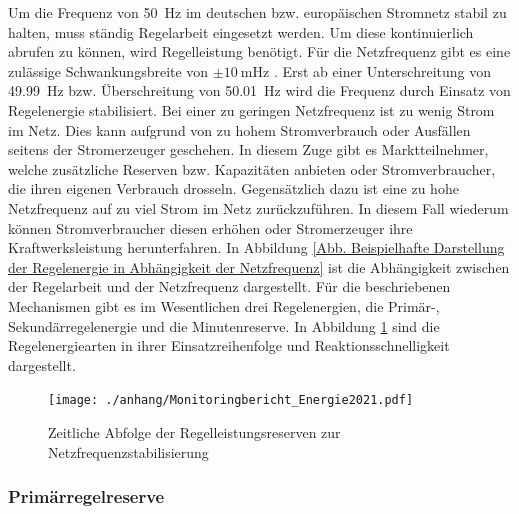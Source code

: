 		Um die Frequenz von \SI{50}{\hertz} im deutschen bzw. europäischen Stromnetz stabil zu halten, muss ständig Regelarbeit eingesetzt werden.
		Um diese kontinuierlich abrufen zu können, wird Regelleistung benötigt.
		Für die Netzfrequenz gibt es eine zulässige Schwankungsbreite von $\pm\SI{10}{\milli\hertz}$ \parencite{Angerer_Krohns}.
		Erst ab einer Unterschreitung von \SI{49,99}{\hertz} bzw. Überschreitung von \SI{50,01}{\hertz} wird die Frequenz durch Einsatz von Regelenergie stabilisiert.
		Bei einer zu geringen Netzfrequenz ist zu wenig Strom im Netz.
		Dies kann aufgrund von zu hohem Stromverbrauch oder Ausfällen seitens der Stromerzeuger geschehen.
		In diesem Zuge gibt es Marktteilnehmer, welche zusätzliche Reserven bzw. Kapazitäten anbieten oder Stromverbraucher, die ihren eigenen Verbrauch drosseln.
		Gegensätzlich dazu ist eine zu hohe Netzfrequenz auf zu viel Strom im Netz zurückzuführen. 
		In diesem Fall wiederum können Stromverbraucher diesen erhöhen oder Stromerzeuger ihre Kraftwerksleistung herunterfahren. 
		In Abbildung \ref{Abb. Beispielhafte Darstellung der Regelenergie in Abhängigkeit der Netzfrequenz} ist die Abhängigkeit zwischen der Regelarbeit und der Netzfrequenz dargestellt.
		Für die beschriebenen Mechanismen gibt es im Wesentlichen drei Regelenergien, die Primär-, Sekundärregelenergie und die Minutenreserve.
		In Abbildung \ref{Abb. Reaktionskette Regelenergien} sind die Regelenergiearten in ihrer Einsatzreihenfolge und Reaktionsschnelligkeit dargestellt. 
		
		\begin{figure} [H]
			\centering
			\label{Abb. Reaktionskette Regelenergien}
			\texttt{[image: ./anhang/Monitoringbericht\_Energie2021.pdf]}
			\caption{Zeitliche Abfolge der Regelleistungsreserven zur Netzfrequenzstabilisierung \parencite{Elektrizitätswirtschaft}}
		\end{figure}
		
		\subsubsection{Primärregelreserve} \label{sect: Primärregelreserve}
		
